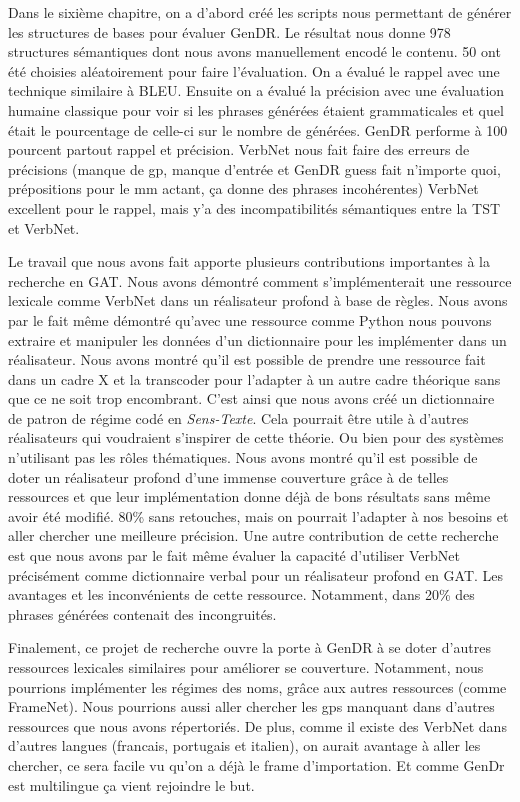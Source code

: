 Dans le sixième chapitre, on a d'abord créé les scripts nous permettant de générer les structures de bases pour évaluer GenDR. Le résultat nous donne 978 structures sémantiques dont nous avons manuellement encodé le contenu. 50 ont été choisies aléatoirement pour faire l'évaluation. On a évalué le rappel avec une technique similaire à BLEU. Ensuite on a évalué la précision avec une évaluation humaine classique pour voir si les phrases générées étaient grammaticales et quel était le pourcentage de celle-ci sur le nombre de générées. GenDR performe à 100 pourcent partout rappel et précision. VerbNet nous fait faire des erreurs de précisions (manque de gp, manque d'entrée et GenDR guess fait n'importe quoi, prépositions pour le mm actant, ça donne des phrases incohérentes) VerbNet excellent pour le rappel, mais y'a des incompatibilités sémantiques entre la TST et VerbNet.  

Le travail que nous avons fait apporte plusieurs contributions importantes à la recherche en \ac{GAT}. Nous avons démontré comment s'implémenterait une ressource lexicale comme VerbNet dans un réalisateur profond à base de règles. Nous avons par le fait même démontré qu'avec une ressource comme Python nous pouvons extraire et manipuler les données d'un dictionnaire pour les implémenter dans un réalisateur. Nous avons montré qu'il est possible de prendre une ressource fait dans un cadre X et la transcoder pour l'adapter à un autre cadre théorique sans que ce ne soit trop encombrant. C'est ainsi que nous avons créé un dictionnaire de patron de régime codé en \emph{Sens-Texte}. Cela pourrait être utile à d'autres réalisateurs qui voudraient s'inspirer de cette théorie. Ou bien pour des systèmes n'utilisant pas les rôles thématiques. Nous avons montré qu'il est possible de doter un réalisateur profond d'une immense couverture grâce à de telles ressources et que leur implémentation donne déjà de bons résultats sans même avoir été modifié. 80\% sans retouches, mais on pourrait l'adapter à nos besoins et aller chercher une meilleure précision. Une autre contribution de cette recherche est que nous avons par le fait même évaluer la capacité d'utiliser VerbNet précisément comme dictionnaire verbal pour un réalisateur profond en GAT. Les avantages et les inconvénients de cette ressource. Notamment, dans 20\% des phrases générées contenait des incongruités.

Finalement, ce projet de recherche ouvre la porte à GenDR à se doter d'autres ressources lexicales similaires pour améliorer se couverture. Notamment, nous pourrions implémenter les régimes des noms, grâce aux autres ressources (comme FrameNet). Nous pourrions aussi aller chercher les gps manquant dans d'autres ressources que nous avons répertoriés. De plus, comme il existe des VerbNet dans d'autres langues (francais, portugais et italien), on aurait avantage à aller les chercher, ce sera facile vu qu'on a déjà le frame d'importation. Et comme GenDr est multilingue ça vient rejoindre le but.



